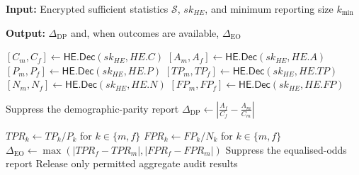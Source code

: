 \documentclass[a4paper,fleqn]{cas-dc}
\begin{document}
\begin{algorithm}[h] 
\caption{Aggregate Fairness Audit} 
\label{alg:fairness_audit}
\textbf{Input:} Encrypted sufficient statistics $\mathcal{S}$, $sk_{HE}$, and minimum reporting size $k_{\min}$ 

\textbf{Output:} 
$\Delta_{\mathrm{DP}}$ and, when outcomes are available, $\Delta_{\mathrm{EO}}$ 

\begin{algorithmic}[1]

\State $[C_m,C_f]\leftarrow \mathsf{HE.Dec}(sk_{HE},HE.C)$
\State $[A_m,A_f]\leftarrow \mathsf{HE.Dec}(sk_{HE},HE.A)$
\State $[P_m,P_f]\leftarrow \mathsf{HE.Dec}(sk_{HE},HE.P)$
\State $[TP_m,TP_f]\leftarrow \mathsf{HE.Dec}(sk_{HE},HE.TP)$
\State $[N_m,N_f]\leftarrow \mathsf{HE.Dec}(sk_{HE},HE.N)$
\State $[FP_m,FP_f]\leftarrow \mathsf{HE.Dec}(sk_{HE},HE.FP)$

    \State Suppress the demographic-parity report
\Else 
    \State $\Delta_{\mathrm{DP}} \leftarrow \left| \frac{A_f}{C_f}-\frac{A_m}{C_m} \right|$ 
\EndIf 

    \State $TPR_k\leftarrow TP_k/P_k$ for $k\in\{m,f\}$ 
    \State $FPR_k\leftarrow FP_k/N_k$ for $k\in\{m,f\}$ 
    \State $\Delta_{\mathrm{EO}} \leftarrow \max( |TPR_f-TPR_m|, |FPR_f-FPR_m| )$
\Else 
    \State Suppress the equalised-odds report
\EndIf 
    \State Release only permitted aggregate audit results 
\end{algorithmic}
\end{algorithm}
\end{document}
